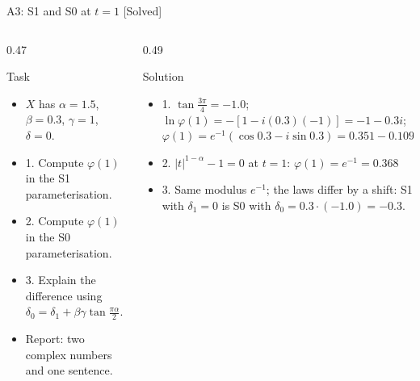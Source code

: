 \begin{frame}{A3: S1 and S0 at $t = 1$ [Solved]}
\itemsize{\footnotesize}
\begin{columns}[T]
\begin{column}{0.47\textwidth}
\begin{block}{Task}
\begin{itemize}
    \item $X$ has $\alpha = 1.5$, $\beta = 0.3$, $\gamma = 1$, $\delta = 0$.
    \item 1. Compute $\varphi(1)$ in the S1 parameterisation.
    \item 2. Compute $\varphi(1)$ in the S0 parameterisation.
    \item 3. Explain the difference using $\delta_0 = \delta_1 + \beta\gamma\tan\frac{\pi\alpha}{2}$.
    \item Report: two complex numbers and one sentence.
\end{itemize}
\end{block}
\end{column}
\begin{column}{0.49\textwidth}
\begin{exampleblock}{Solution}
\begin{itemize}
    \item 1. $\tan\frac{3\pi}{4} = -1.0$; $\ln\varphi(1) = -[1 - i(0.3)(-1)] = -1 - 0.3i$; $\varphi(1) = e^{-1}(\cos 0.3 - i\sin 0.3) = 0.351 - 0.109i$
    \item 2. $|t|^{1-\alpha} - 1 = 0$ at $t = 1$: $\varphi(1) = e^{-1} = 0.368$
    \item 3. Same modulus $e^{-1}$; the laws differ by a shift: S1 with $\delta_1 = 0$ is S0 with $\delta_0 = 0.3 \cdot (-1.0) = -0.3$.
\end{itemize}
\end{exampleblock}
\end{column}
\end{columns}
\end{frame}

